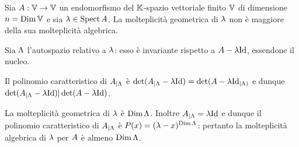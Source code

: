 \begin{Theorem}
	Sia $A: \mathbb{V} \rightarrow \mathbb{V}$ un
  endomorfismo del $\mathbb{K}$-spazio vettoriale finito $\mathbb{V}$ di
  dimensione $n = \operatorname{\operatorname{Dim}}{\mathbb{V}}$ e sia
  $\lambda \in \operatorname{Spect}{A}$.
  La molteplicit\`a geometrica di $\lambda$ non \`e maggiore della sua 
  molteplicit\`a algebrica.
\end{Theorem}
\Proof Sia $\Lambda$ l'autospazio relativo a $\lambda$: esso \`e
invariante rispetto a $\LinearTransformation - \Eigenvalue\Identity$,
essendone il nucleo.
\par Il polinomio caratteristico di
${A}_{|\Lambda}$
\`e
$\Determinant
(\Restricted{\LinearTransformation}{\Eigenspace} - \Eigenvalue\Identity)
= \Determinant(\Restricted{\LinearTransformation - \Eigenvalue\Identity}
{\Eigenspace)}$
e dunque
$\Determinant
(\Restricted{\LinearTransformation}{\Eigenspace} - \Eigenvalue\Identity)
| \Determinant(\LinearTransformation - \Eigenvalue\Identity)$.
\par La molteplicit\`a geometrica di $\lambda$ \`e
$\operatorname{Dim}{\Lambda}$. Inoltre
$\Restricted{\LinearTransformation}{\Eigenspace} = \Eigenvalue\Identity$
e dunque il polinomio caratteristico di
${A}_{|\Lambda}$
\`e
$P(x)
= (\lambda - x)^{\operatorname{Dim}{\Lambda}}$:
pertanto la molteplicit\`a algebrica di $\lambda$ per
$A$ \`e almeno $\operatorname{Dim}{\Lambda}$.
\EndProof
